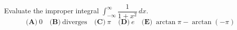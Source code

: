 Evaluate the improper integral $\displaystyle\int_{-\infty}^{\infty}\dfrac{1}{1+x^2}\,dx$.
\[\textbf{(A)}~0\quad\textbf{(B)}~\text{diverges}\quad\textbf{(C)}~\pi\quad\textbf{(D)}~e\quad\textbf{(E)}~\arctan\pi-\arctan(-\pi)\]

